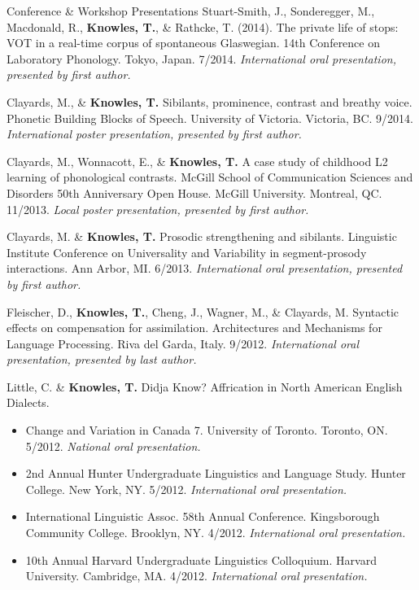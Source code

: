\documentclass{resume} %
\begin{document}
\begin{rSection}{Conference \& Workshop Presentations}
	Stuart-Smith, J., Sonderegger, M., Macdonald, R., {\bf Knowles, T.}, \& Rathcke, T. (2014). The private life of stops: VOT in a real-time corpus of spontaneous Glaswegian. 14th Conference on Laboratory Phonology. Tokyo, Japan. 7/2014. \emph{International oral presentation, presented by first author.}
	
	Clayards, M., \& {\bf Knowles, T.} Sibilants, prominence, contrast and breathy voice. Phonetic Building Blocks of Speech. University of Victoria. Victoria, BC. 9/2014. \emph{International poster presentation, presented by first author.}
	
	Clayards, M., Wonnacott, E., \& {\bf Knowles, T.} A case study of childhood L2 learning of phonological contrasts. McGill School of Communication Sciences and Disorders 50th Anniversary Open House. McGill University. Montreal, QC. 11/2013. \emph{Local poster presentation, presented by first author.}
	
	Clayards, M. \& {\bf Knowles, T.} Prosodic strengthening and sibilants. Linguistic Institute Conference on Universality and Variability in segment-prosody interactions. Ann Arbor, MI. 6/2013. \emph{International oral presentation, presented by first author.}
	
	
	Fleischer, D., {\bf Knowles, T.}, Cheng, J., Wagner, M., \& Clayards, M. Syntactic effects on compensation for assimilation. Architectures and Mechanisms for Language Processing. Riva del Garda, Italy. 9/2012. \emph{International oral presentation, presented by last author.}
	
	Little, C. \& {\bf Knowles, T.} Didja Know? Affrication in North American English Dialects.
	\begin{itemize}
				\renewcommand\labelitemi{$\cdot$}
		\item Change and Variation in Canada 7. University of Toronto. Toronto, ON. 5/2012. \emph{National oral presentation.}
		\item 2nd Annual Hunter Undergraduate Linguistics and Language Study. Hunter College. New York, NY. 5/2012. \emph{International oral presentation.}
		\item International Linguistic Assoc. 58th Annual Conference. Kingsborough Community College. Brooklyn, NY. 4/2012. \emph{International oral presentation.}
		\item 10th Annual Harvard Undergraduate Linguistics Colloquium. Harvard University. Cambridge, MA. 4/2012. \emph{International oral presentation.}
	\end{itemize}
	

\end{rSection}
\end{document}
